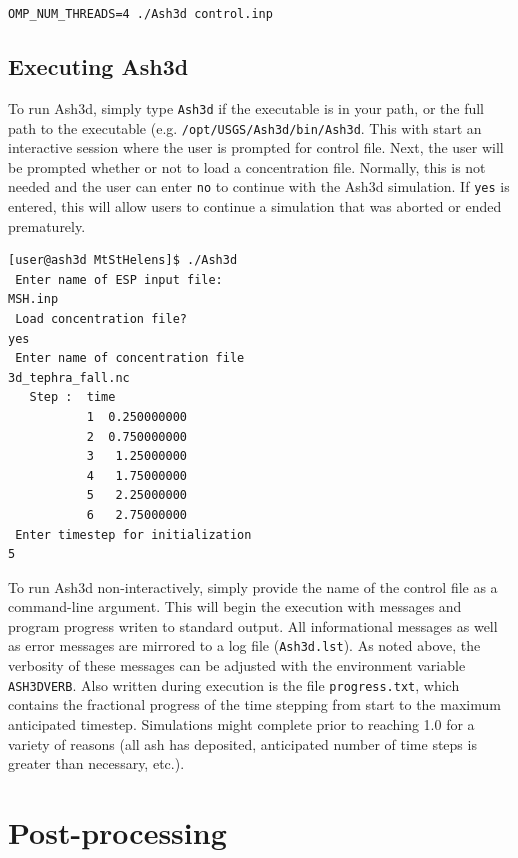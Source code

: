 \texttt{OMP\_NUM\_THREADS=4 ./Ash3d control.inp}



\subsection{Executing Ash3d}
To run Ash3d, simply type \texttt{Ash3d} if the executable is in your path, or
the full path to the executable (e.g. \texttt{/opt/USGS/Ash3d/bin/Ash3d}. This
with start an interactive session where the user is prompted for control file.
Next, the user will be prompted whether or not to load a concentration file.
Normally, this is not needed and the user can enter \texttt{no} to continue
with the Ash3d simulation. If \texttt{yes} is entered,
this will allow users to continue a simulation that was aborted or ended prematurely.

\begin{verbatim}
[user@ash3d MtStHelens]$ ./Ash3d 
 Enter name of ESP input file:
MSH.inp
 Load concentration file?
yes
 Enter name of concentration file
3d_tephra_fall.nc
   Step :  time
           1  0.250000000    
           2  0.750000000    
           3   1.25000000    
           4   1.75000000    
           5   2.25000000    
           6   2.75000000    
 Enter timestep for initialization
5
\end{verbatim}

To run Ash3d non-interactively, simply provide the name of the control file as
a command-line argument.  This will begin the execution with messages and program
progress writen to standard output.  All informational messages as well as
error messages are mirrored to a log file (\texttt{Ash3d.lst}).  As noted above,
the verbosity of these messages can be adjusted with the environment variable
\texttt{ASH3DVERB}. Also written during execution is the file \texttt{progress.txt},
which contains the fractional progress of the time stepping from start to the maximum
anticipated timestep. Simulations might complete prior to reaching 1.0 for a
variety of reasons (all ash has deposited, anticipated number of time steps is
greater than necessary, etc.).

%
\section{Post-processing}\label{ChapUsageSecPostProc}

